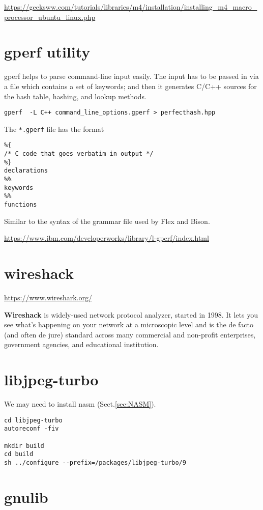 \url{https://geeksww.com/tutorials/libraries/m4/installation/installing_m4_macro_processor_ubuntu_linux.php}


\section{gperf utility}
\label{sec:gperf}

gperf helps to parse command-line input easily.  The input has to be passed in
via a file which contains a set of keywords; and then
it generates C/C++ sources for the hash table, hashing, and lookup methods.
\begin{verbatim}
gperf  -L C++ command_line_options.gperf > perfecthash.hpp
\end{verbatim}

The \verb!*.gperf! file has the format
\begin{verbatim}
%{
/* C code that goes verbatim in output */
%}
declarations
%%
keywords
%%
functions
\end{verbatim}
Similar to the syntax of the grammar file used by Flex and Bison.

\url{https://www.ibm.com/developerworks/library/l-gperf/index.html}


\section{wireshack}
\label{sec:wireshack}

\url{https://www.wireshark.org/}

{\bf Wireshack} is  widely-used network protocol analyzer, started in 1998. It
lets you see what's happening on your network at a microscopic level and is the
de facto (and often de jure) standard across many commercial and non-profit
enterprises, government agencies, and educational institution.


\section{libjpeg-turbo}
\label{sec:libjpeg-turbo}

We may need to install nasm (Sect.\ref{sec:NASM}).

\begin{verbatim}
cd libjpeg-turbo
autoreconf -fiv

mkdir build
cd build
sh ../configure --prefix=/packages/libjpeg-turbo/9
\end{verbatim}

\section{gnulib}
\label{sec:gnulib}

